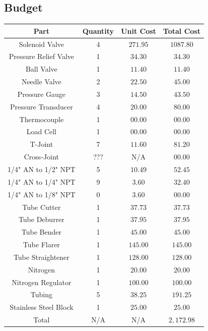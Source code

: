 \documentclass[9pt]{article} %
\numberwithin{equation}{section} %
\begin{document}
\subsection{Budget}
\begin{center}
 \begin{tabular}{||c c c c||} 
 \hline
 Part & Quantity & Unit Cost & Total Cost\\
 \hline\hline
 Solenoid Valve & 4 & $271.95$ & $1087.80$\\ 
 \hline
 Pressure Relief Valve & 1 & $34.30$ & $34.30$\\ 
 \hline
 Ball Valve & 1 & $11.40$ & $11.40$\\ 
 \hline
 Needle Valve & 2 & $22.50$ & $45.00$\\ 
 \hline
 Pressure Gauge & 3 & $14.50$ & $43.50$\\ 
 \hline
 Pressure Transducer & 4 & $20.00$ & $80.00$\\ 
 \hline
 Thermocouple & 1 & $00.00$ & $00.00$\\ 
 \hline
 Load Cell & 1 & $00.00$ & $00.00$\\
 \hline
 T-Joint & 7 & $11.60$ & $81.20$\\
 \hline
 Cross-Joint & ??? & N/A & $00.00$\\
 \hline
 1/4" AN to 1/2" NPT & 5 & $10.49$ & $52.45$\\
 \hline
 1/4" AN to 1/4" NPT & 9 & $3.60$ & $32.40$\\
 \hline
 1/4" AN to 1/8" NPT & 0 & $3.60$ & $00.00$\\
 \hline
 Tube Cutter & 1 & $37.73$ & $37.73$\\
 \hline
 Tube Deburrer & 1 & $37.95$ & $37.95$\\
 \hline
 Tube Bender & 1 & $45.00$ & $45.00$\\
 \hline
 Tube Flarer & 1 & $145.00$ & $145.00$\\
 \hline
 Tube Straightener & 1 & $128.00$ & $128.00$\\
 \hline
 Nitrogen & 1 & $20.00$ & $20.00$\\
 \hline
 Nitrogen Regulator & 1 & $100.00$ & $100.00$\\
 \hline
 Tubing & 5 & $38.25$ & $191.25$\\
 \hline
 Stainless Steel Block & 1 & $25.00$ & $25.00$\\
 \hline\hline
 Total & N/A & N/A & $2,172.98$\\
 \hline
\end{tabular}
\end{center}
\end{document}
